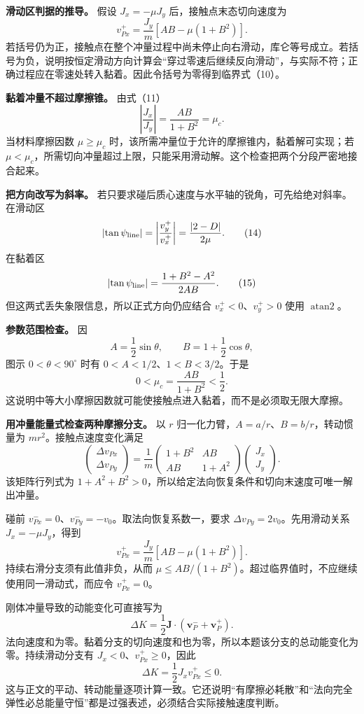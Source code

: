 \documentclass[12pt,a4paper,UTF8]{ctexart}
\begin{document}
\textbf{滑动区判据的推导。} 假设 \(J_x=-\mu J_y\)
后，接触点末态切向速度为 \[
v_{Px}^+
=\frac{J_y}{m}[AB-\mu(1+B^2)].
\]
若括号仍为正，接触点在整个冲量过程中尚未停止向右滑动，库仑等号成立。若括号为负，说明按恒定滑动方向计算会``穿过零速后继续反向滑动''，与实际不符；正确过程应在零速处转入黏着。因此令括号为零得到临界式（10）。

\textbf{黏着冲量不超过摩擦锥。} 由式（11） \[
\left|\frac{J_x}{J_y}\right|
=\frac{AB}{1+B^2}
=\mu_c.
\] 当材料摩擦因数 \(\mu\ge\mu_c\)
时，该所需冲量位于允许的摩擦锥内，黏着解可实现；若
\(\mu<\mu_c\)，所需切向冲量超过上限，只能采用滑动解。这个检查把两个分段严密地接合起来。

\textbf{把方向改写为斜率。}
若只要求碰后质心速度与水平轴的锐角，可先给绝对斜率。在滑动区 \[
\left|\tan\psi_{\rm line}\right|
=\left|\frac{v_y^+}{v_x^+}\right|
=\frac{|2-D|}{2\mu}. \tag{14}
\] 在黏着区 \[
\left|\tan\psi_{\rm line}\right|
=\frac{1+B^2-A^2}{2AB}. \tag{15}
\] 但这两式丢失象限信息，所以正式方向仍应结合 \(v_x^+<0\)、\(v_y^+>0\)
使用 \(\operatorname{atan2}\)。

\textbf{参数范围检查。} 因 \[
A=\frac12\sin\theta,\qquad
B=1+\frac12\cos\theta,
\] 图示 \(0<\theta<90^\circ\) 时有 \(0<A<1/2\)、\(1<B<3/2\)。于是 \[
0<\mu_c=\frac{AB}{1+B^2}<\frac12.
\]
这说明中等大小摩擦因数就可能使接触点进入黏着，而不是必须取无限大摩擦。

\textbf{用冲量能量式检查两种摩擦分支。} 以 \(r\)
归一化力臂，\(A=a/r\)、\(B=b/r\)，转动惯量为
\(mr^2\)。接触点速度变化满足 \[
\begin{pmatrix}\Delta v_{Px}\\\Delta v_{Py}\end{pmatrix}
=\frac1m\begin{pmatrix}1+B^2&AB\\AB&1+A^2\end{pmatrix}
\begin{pmatrix}J_x\\J_y\end{pmatrix}.
\] 该矩阵行列式为
\(1+A^2+B^2>0\)，所以给定法向恢复条件和切向末速度可唯一解出冲量。

碰前 \(v_{Px}^-=0\)、\(v_{Py}^-=-v_0\)。取法向恢复系数一，要求
\(\Delta v_{Py}=2v_0\)。先用滑动关系 \(J_x=-\mu J_y\)，得到 \[
v_{Px}^+=\frac{J_y}{m}[AB-\mu(1+B^2)].
\] 持续右滑分支须有此值非负，从而
\(\mu\le AB/(1+B^2)\)。超过临界值时，不应继续使用同一滑动式，而应令
\(v_{Px}^+=0\)。

刚体冲量导致的动能变化可直接写为 \[
\Delta K=\frac12\bm J\cdot(\bm v_P^-+\bm v_P^+).
\]
法向速度和为零。黏着分支的切向速度和也为零，所以本题该分支的总动能变化为零。持续滑动分支有
\(J_x<0\)、\(v_{Px}^+\ge0\)，因此 \[
\Delta K=\frac12J_xv_{Px}^+\le0.
\]
这与正文的平动、转动能量逐项计算一致。它还说明``有摩擦必耗散''和``法向完全弹性必总能量守恒''都是过强表述，必须结合实际接触速度判断。
\end{document}
